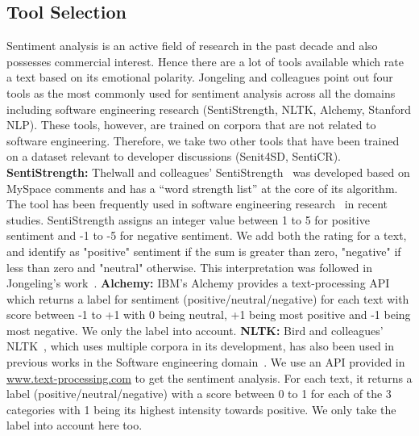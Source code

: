 \subsection{Tool Selection}
Sentiment analysis is an active field of research 
in the past decade 
and also possesses commercial interest. 
Hence there are a lot of tools available 
which rate a text based on its emotional polarity. 
Jongeling and colleagues point out four tools 
as the most commonly used for sentiment analysis 
across all the domains 
including software engineering research 
(SentiStrength, NLTK, Alchemy, Stanford NLP).
These tools, however, are trained on corpora that are not related to software engineering.
Therefore, we take two other tools that have been trained on a dataset relevant to developer discussions (Senit4SD, SentiCR). 
\newline
\indent \textbf{SentiStrength:} Thelwall and colleagues' SentiStrength~\cite{thelwall2010sentiment} 
was developed based on MySpace comments and 
has a ``word strength list'' at the core of its algorithm. 
The tool has been frequently used in software engineering research~\cite{garcia2013role,guzman2014sentiment,novielli2015challenges,guzman2013towards,sinha2016analyzing} in recent studies. SentiStrength assigns an integer value between 1 to 5 for positive sentiment and -1 to -5 for negative sentiment. We add both the rating for a text, and identify as "positive" sentiment if the sum is greater than zero, "negative" if less than zero and "neutral" otherwise. This interpretation was followed in Jongeling's work~\cite{jongeling2017negative}.
\newline
\indent\textbf{Alchemy:} IBM's Alchemy 
provides a text-processing API which returns a label for sentiment (positive/neutral/negative) for each text with score between -1 to +1 with 0 being neutral, +1 being most positive and -1 being most negative. We only the label into account.
\newline
\indent\textbf{NLTK:} Bird and colleagues' NLTK~\cite{bird2009natural}, 
which uses multiple corpora in its development, 
has also been used in previous works 
in the Software engineering domain~\cite{pletea2014security,rousinopoulos2014sentiment}. 
We use an API provided in \href{www.text-processing.com}{www.text-processing.com} to get the sentiment analysis. For each text, it returns a label (positive/neutral/negative) with a score between 0 to 1 for each of the 3 categories with 1 being its highest intensity towards positive. We only take the label into account here too.
